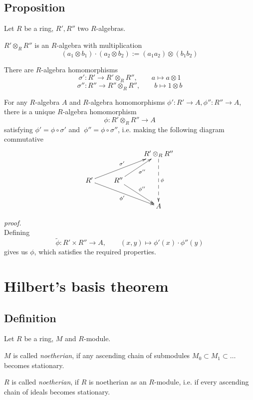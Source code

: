 \documentclass[12pt]{book}
\begin{document}
\begin{spacing}{1.3}
\subsection{Proposition} %
Let $R$ be a ring, $R', R''$ two $R$-algebras. 
\begin{compactenum}
\item $R' \otimes_R R''$ is an $R$-algebra with multiplication
$$(a_1 \otimes b_1) \cdot (a_2 \otimes b_2):= (a_1 a_2) \otimes (b_1 b_2)$$
\item There are $R$-algebra homomorphisms
$$\sigma': R' \longrightarrow R' \otimes_R R'', \qquad a \mapsto a \otimes 1$$
$$\sigma'':R'' \longrightarrow R'' \otimes_R R'', \qquad b \mapsto 1 \otimes b$$
\item For any $R$-algebra $A$ and $R$-algebra homomorphisms $\phi':R' \longrightarrow A, \phi'': R'' \longrightarrow A$, there is a unique $R$-algebra homomorphism
$$\phi: R' \otimes_R R'' \longrightarrow A$$
satisfying $\phi'=\phi \circ \sigma'$ and $\ \phi''=\phi \circ \sigma''$, i.e. making the following diagram commutative
$$\begin{xy}
\xymatrix{
&& R' \otimes_R R'' \ar@{-->}[dd]^{\phi} \\ R' \ar[rru]^{\sigma'} \ar[rrd]_{\phi'} & R'' \ar[ru]_{\sigma''} \ar[rd]^{\phi''} & \\ && A 
}
\end{xy}$$
\end{compactenum}
\textit{proof.}\\
Defining $$\tilde{\phi}: R' \times R'' \longrightarrow A, \qquad (x,y) \mapsto \phi'(x) \cdot \phi''(y)$$
gives us $\phi$, which satisfies the required properties.


\renewcommand*\thesection{§ \arabic{section}\quad }
\section{Hilbert's basis theorem}
\renewcommand*\thesection{\arabic{section}}

\subsection{Definition} %
Let $R$ be a ring, $M$ and $R$-module.
\begin{compactenum}
\item $M$ is called \textit{noetherian}, if any ascending chain of submodules $M_0 \subset M_1 \subset \ldots$ becomes stationary.
\item $R$ is called \textit{noetherian}, if $R$ is noetherian as an $R$-module, i.e. if every ascending chain of ideals becomes stationary.
\end{compactenum}


\end{spacing}
\end{document}
